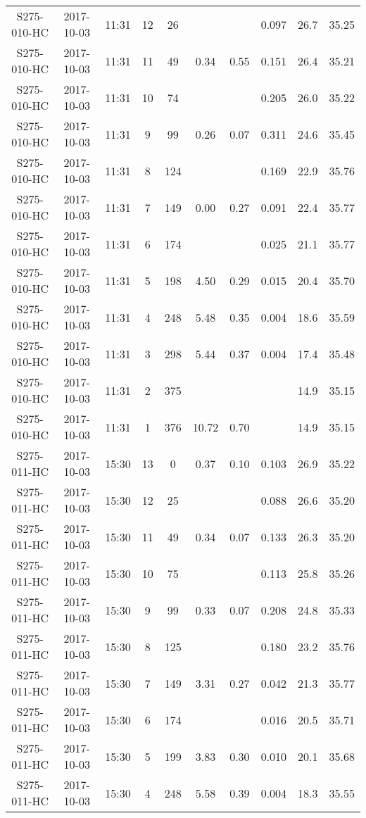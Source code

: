 \begin{longtable}{cccccccccc}
  S275-010-HC & 2017-10-03 & 11:31 & 12 & 26 &  &  & 0.097 & 26.7 & 35.25 \\ 
  S275-010-HC & 2017-10-03 & 11:31 & 11 & 49 & 0.34 & 0.55 & 0.151 & 26.4 & 35.21 \\ 
  S275-010-HC & 2017-10-03 & 11:31 & 10 & 74 &  &  & 0.205 & 26.0 & 35.22 \\ 
  S275-010-HC & 2017-10-03 & 11:31 & 9 & 99 & 0.26 & 0.07 & 0.311 & 24.6 & 35.45 \\ 
  S275-010-HC & 2017-10-03 & 11:31 & 8 & 124 &  &  & 0.169 & 22.9 & 35.76 \\ 
  S275-010-HC & 2017-10-03 & 11:31 & 7 & 149 & 0.00 & 0.27 & 0.091 & 22.4 & 35.77 \\ 
  S275-010-HC & 2017-10-03 & 11:31 & 6 & 174 &  &  & 0.025 & 21.1 & 35.77 \\ 
  S275-010-HC & 2017-10-03 & 11:31 & 5 & 198 & 4.50 & 0.29 & 0.015 & 20.4 & 35.70 \\ 
  S275-010-HC & 2017-10-03 & 11:31 & 4 & 248 & 5.48 & 0.35 & 0.004 & 18.6 & 35.59 \\ 
  S275-010-HC & 2017-10-03 & 11:31 & 3 & 298 & 5.44 & 0.37 & 0.004 & 17.4 & 35.48 \\ 
  S275-010-HC & 2017-10-03 & 11:31 & 2 & 375 &  &  &  & 14.9 & 35.15 \\ 
  S275-010-HC & 2017-10-03 & 11:31 & 1 & 376 & 10.72 & 0.70 &  & 14.9 & 35.15 \\ 
  S275-011-HC & 2017-10-03 & 15:30 & 13 & 0 & 0.37 & 0.10 & 0.103 & 26.9 & 35.22 \\ 
  S275-011-HC & 2017-10-03 & 15:30 & 12 & 25 &  &  & 0.088 & 26.6 & 35.20 \\ 
  S275-011-HC & 2017-10-03 & 15:30 & 11 & 49 & 0.34 & 0.07 & 0.133 & 26.3 & 35.20 \\ 
  S275-011-HC & 2017-10-03 & 15:30 & 10 & 75 &  &  & 0.113 & 25.8 & 35.26 \\ 
  S275-011-HC & 2017-10-03 & 15:30 & 9 & 99 & 0.33 & 0.07 & 0.208 & 24.8 & 35.33 \\ 
  S275-011-HC & 2017-10-03 & 15:30 & 8 & 125 &  &  & 0.180 & 23.2 & 35.76 \\ 
  S275-011-HC & 2017-10-03 & 15:30 & 7 & 149 & 3.31 & 0.27 & 0.042 & 21.3 & 35.77 \\ 
  S275-011-HC & 2017-10-03 & 15:30 & 6 & 174 &  &  & 0.016 & 20.5 & 35.71 \\ 
  S275-011-HC & 2017-10-03 & 15:30 & 5 & 199 & 3.83 & 0.30 & 0.010 & 20.1 & 35.68 \\ 
  S275-011-HC & 2017-10-03 & 15:30 & 4 & 248 & 5.58 & 0.39 & 0.004 & 18.3 & 35.55 \\ 

\end{longtable}
